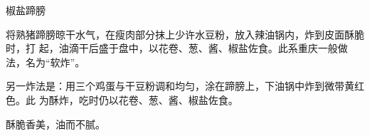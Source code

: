 %
%
%
%
%
%
%
\begin{recipe}{椒盐蹄膀}

\ingredients


\preparation

将熟猪蹄膀晾干水气，在瘦肉部分抹上少许水豆粉，放入辣油锅内，炸到皮面酥脆时，打
起，油滴干后盛于盘中，以花卷、葱、酱、椒盐佐食。此系重庆一般做法，名为“软炸”。

另一炸法是：用三个鸡蛋与干豆粉调和均匀，涂在蹄膀上，下油锅中炸到微带黄红色。此
为酥炸，吃时仍以花卷、葱、酱、椒盐佐食。

\features

酥脆香美，油而不腻。

\end{recipe}


